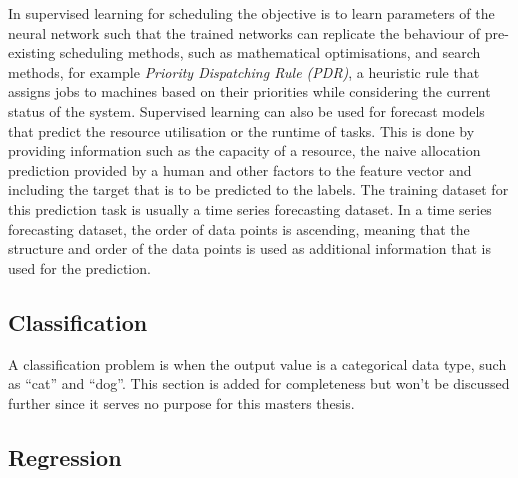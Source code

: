         In supervised learning for scheduling the objective is to learn parameters of the neural network such that the trained networks can replicate the behaviour of pre-existing scheduling methods, such as mathematical optimisations, and search methods, for example \emph{Priority Dispatching Rule (PDR)}, a heuristic rule that assigns jobs to machines based on their priorities while considering the current status of the system.
        Supervised learning can also be used for forecast models that predict the resource utilisation or the runtime of tasks.
        This is done by providing information such as the capacity of a resource, the naive allocation prediction provided by a human and other factors to the feature vector and including the target that is to be predicted to the labels. 
        The training dataset for this prediction task is usually a time series forecasting dataset.
        In a time series forecasting dataset, the order of data points is ascending, meaning that the structure and order of the data points is used as additional information that is used for the prediction.

        \subsection{Classification}
        \label{sec:classification-supervised-learning-background}

            A classification problem is when the output value is a categorical data type, such as ``cat'' and ``dog''.
            This section is added for completeness but won't be discussed further since it serves no purpose for this masters thesis.

        \subsection{Regression}
        \label{sec:regression-supervised-learning-background}

